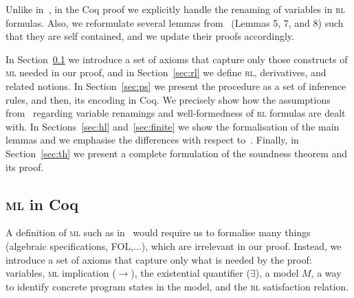 \documentclass[conference]{IEEEtran}
\newenvironment{todo}{\medskip\hrule\smallskip\noindent}{\smallskip\hrule\medskip}
\newcommand{\vr}[1]{\begin{todo}\textcolor{blue}{Vlad:}\\ \color{orange}{#1}\color{black}\end{todo}}
\newcommand{\vr}[1]{}
\newcommand{\M}{\mathit{M}}
\renewcommand{\implies}{\rightarrow}
\newcommand{\ML}{\textsc{ml}\xspace}
\newcommand{\RL}{\textsc{rl}\xspace}
\begin{document}
Unlike in~\cite{lucanu-rusu-arusoaie-nowak-LRC2015}, in the Coq proof we explicitly handle the renaming of variables in \RL formulas. 
Also, we reformulate several lemmas from~\cite{lucanu-rusu-arusoaie-nowak-LRC2015} (Lemmas 5, 7, and 8) such that they are self contained, and we update their proofs accordingly.


In Section~\ref{sec:ml} we introduce a set of axioms that capture only those constructs of \ML needed in our proof, and in Section~\ref{sec:rl} we define \RL, derivatives, and related notions.
In Section~\ref{sec:ps} we present the procedure as a set of inference rules, and then, its encoding in Coq. 
We precisely show how the assumptions from~\cite{lucanu-rusu-arusoaie-nowak-LRC2015} regarding variable renamings and well-formedness of \RL formulas are dealt with.
In Sections~\ref{sec:hl} and~\ref{sec:finite} we show the formalisation of the main lemmas and we emphasise the differences with respect to~\cite{lucanu-rusu-arusoaie-nowak-LRC2015}.
Finally, in Section~\ref{sec:th} we present a complete formulation of the soundness theorem and its proof.

\subsection{\ML in Coq}
\label{sec:ml}

A definition of \ML such as in~\cite{lucanu-rusu-arusoaie-nowak-LRC2015} would require us to formalise many things (algebraic specifications, FOL,...), which are irrelevant in our proof.
Instead, we introduce a set of axioms that capture only what is needed by the proof: variables, \ML implication ($\implies$), the existential quantifier ($\exists$), a model $\M$, a way to identify concrete program states in the model, and the \RL satisfaction relation.
\end{document}
